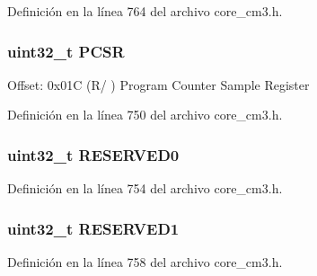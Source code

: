 Definición en la línea 764 del archivo core\+\_\+cm3.\+h.

\subsubsection[{\texorpdfstring{P\+C\+SR}{PCSR}}]{ uint32\+\_\+t P\+C\+SR}\hypertarget{struct_d_w_t___type_accef6b622c8a41342ed32345b0922bea}{}\label{struct_d_w_t___type_accef6b622c8a41342ed32345b0922bea}
Offset\+: 0x01C (R/ ) Program Counter Sample Register 

Definición en la línea 750 del archivo core\+\_\+cm3.\+h.

\subsubsection[{\texorpdfstring{R\+E\+S\+E\+R\+V\+E\+D0}{RESERVED0}}]{\setlength{\rightskip}{0pt plus 5cm}uint32\+\_\+t R\+E\+S\+E\+R\+V\+E\+D0}\hypertarget{struct_d_w_t___type_a3bc109a372d05329e22cb7e3bf2b84ba}{}\label{struct_d_w_t___type_a3bc109a372d05329e22cb7e3bf2b84ba}


Definición en la línea 754 del archivo core\+\_\+cm3.\+h.

\subsubsection[{\texorpdfstring{R\+E\+S\+E\+R\+V\+E\+D1}{RESERVED1}}]{\setlength{\rightskip}{0pt plus 5cm}uint32\+\_\+t R\+E\+S\+E\+R\+V\+E\+D1}\hypertarget{struct_d_w_t___type_a9b85a62ba1c4cf0e4ca2b1ff8e5bc85c}{}\label{struct_d_w_t___type_a9b85a62ba1c4cf0e4ca2b1ff8e5bc85c}


Definición en la línea 758 del archivo core\+\_\+cm3.\+h.

